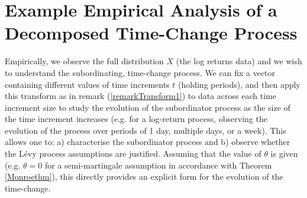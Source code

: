 \documentclass{article}
\begin{document}
\section{Example Empirical Analysis of a Decomposed Time-Change Process}\label{SectionEA}
Empirically, we observe the full distribution $X$ (the log returns data) and we wish to understand the subordinating, time-change process. We can fix a vector containing different values of time increments $t$ (holding periods), and then apply this transform as in remark (\ref{remarkTransform1}) to data across each time increment size to study the evolution of the subordinator process as the size of the time increment increases (e.g. for a log-return process, observing the evolution of the process over periods of 1 day, multiple days, or a week). This allows one to: a) characterise the subordinator process and b) observe whether the Lévy process assumptions are justified. Assuming that the value of $\theta$ is given (e.g. $\theta=0$ for a semi-martingale assumption in accordance with Theorem \ref{Monroethm}), this directly provides an explicit form for the evolution of the time-change. 
\end{document}
